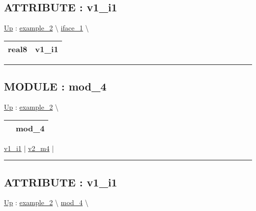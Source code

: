\subsection*{ATTRIBUTE : v1\_i1}
\hypertarget{ecldoc:intest.in1intest.example_2.iface_1.v1_i1}{}
\hyperlink{ecldoc:intest.in1intest.example_2.iface_1}{Up} :
\hspace{0pt} \hyperlink{ecldoc:intest.in1intest.example_2}{example_2} \textbackslash 
\hspace{0pt} \hyperlink{ecldoc:intest.in1intest.example_2.iface_1}{iface_1} \textbackslash 

{\renewcommand{\arraystretch}{1.5}
\begin{tabularx}{\textwidth}{|>{\raggedright\arraybackslash}l|X|}
\hline
\hspace{0pt}real8 & v1\_i1 \\
\hline
\end{tabularx}
}

\par


\rule{\linewidth}{0.5pt}


\subsection*{MODULE : mod\_4}
\hypertarget{ecldoc:intest.in1intest.example_2.mod_4}{}
\hyperlink{ecldoc:intest.in1intest.example_2}{Up} :
\hspace{0pt} \hyperlink{ecldoc:intest.in1intest.example_2}{example_2} \textbackslash 

{\renewcommand{\arraystretch}{1.5}
\begin{tabularx}{\textwidth}{|>{\raggedright\arraybackslash}l|X|}
\hline
\hspace{0pt} & mod\_4 \\
\hline
\end{tabularx}
}

\par


\hyperlink{ecldoc:intest.in1intest.example_2.mod_4.v1_i1}{v1\_i1}  |
\hyperlink{ecldoc:intest.in1intest.example_2.mod_4.v2_m4}{v2\_m4}  |

\rule{\linewidth}{0.5pt}

\subsection*{ATTRIBUTE : v1\_i1}
\hypertarget{ecldoc:intest.in1intest.example_2.mod_4.v1_i1}{}
\hyperlink{ecldoc:intest.in1intest.example_2.mod_4}{Up} :
\hspace{0pt} \hyperlink{ecldoc:intest.in1intest.example_2}{example_2} \textbackslash 
\hspace{0pt} \hyperlink{ecldoc:intest.in1intest.example_2.mod_4}{mod_4} \textbackslash 


